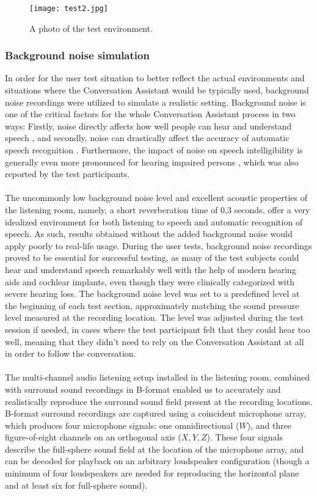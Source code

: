 \documentclass[english, 12pt, a4paper, pdftex, elec, utf8]{aaltothesis}
\begin{document}
\begin{figure}[h]
	\centering
	\texttt{[image: test2.jpg]}
	\caption{A photo of the test environment.}
	\label{fig:photo}
\end{figure}

\subsubsection{Background noise simulation}

In order for the user test situation to better reflect the actual environments and situations where the Conversation Assistant would be typically used, background noise recordings were utilized to simulate a realistic setting. Background noise is one of the critical factors for the whole Conversation Assistant process in two ways: Firstly, noise directly affects how well people can hear and understand speech \cite{pulkki2015communication}, and secondly, noise can drastically affect the accuracy of automatic speech recognition \cite{kallasjoki2016}. Furthermore, the impact of noise on speech intelligibility is generally even more pronounced for hearing impaired persons \cite{healy2016difficulty}, which was also reported by the test participants. \\\\
The uncommonly low background noise level and excellent acoustic properties of the listening room, namely, a short reverberation time of 0,3 seconds, offer a very idealized environment for both listening to speech and automatic recognition of speech. As such, results obtained without the added background noise would apply poorly to real-life usage. During the user tests, background noise recordings proved to be essential for successful testing, as many of the test subjects could hear and understand speech remarkably well with the help of modern hearing aids and cochlear implants, even though they were clinically categorized with severe hearing loss. The background noise level was set to a predefined level at the beginning of each test section, approximately matching the sound pressure level measured at the recording location. The level was adjusted during the test session if needed, in cases where the test participant felt that they could hear too well, meaning that they didn't need to rely on the Conversation Assistant at all in order to follow the conversation. \\\\
The multi-channel audio listening setup installed in the listening room, combined with surround sound recordings in B-format enabled us to accurately and realistically reproduce the surround sound field present at the recording locations. B-format surround recordings are captured using a coincident microphone array, which produces four microphone signals: one omnidirectional ($W$), and three figure-of-eight channels on an orthogonal axis ($X,Y,Z$). These four signals describe the full-sphere sound field at the location of the microphone array, and can be decoded for playback on an arbitrary loudspeaker configuration (though a minimum of four loudspeakers are needed for reproducing the horizontal plane and at least six for full-sphere sound). \cite{furness1990ambisonics, pulkki2015communication} \\\\
\end{document}
